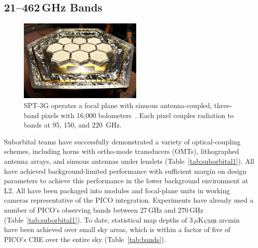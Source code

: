 \subsection{21--462\,GHz Bands}
\label{sec:bolometers} %
%
\begin{figure}  %
\vspace{-15pt} %
\parbox{2.35in}{
\includegraphics[width=2.35in]{figures/SPT3G.jpg} }  %
\parbox{1.40in}{
\caption{\captiontext SPT-3G operates a focal plane with sinuous antenna-coupled, three-band pixels with
16,000 bolometers~\citep{Dutcher2018}. Each pixel couples radiation to bands at 95, 150, and
220~GHz.
\label{fig:spt_fp} }
}
\end{figure}
%
Suborbital teams have successfully demonstrated a variety of optical-coupling schemes, including horns with ortho-mode transducers (OMTs), lithographed antenna arrays, and sinuous antennas under lenslets (Table~\ref{tab:suborbital1}). All have achieved background-limited performance with sufficient margin on design parameters to achieve this performance in the lower background environment at L2. All have been packaged into modules and focal-plane units in working cameras representative of the PICO integration. Experiments have already used a number of PICO's observing bands between 27\,GHz and 270\,GHz (Table~\ref{tab:suborbital1}).  To date, statistical map depths of 3\,$\mu$K$_{\rm CMB}$\,arcmin have been achieved over small sky areas, which is within a factor of five of PICO's CBE over the entire sky (Table~\ref{tab:bands}). %




